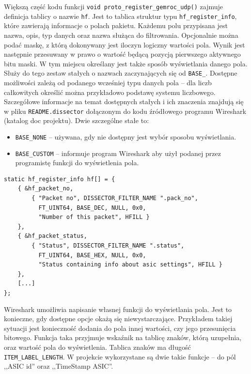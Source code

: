 \documentclass[a4paper, 12pt, twoside, openright]{article}
\begin{document}
\indent\par
Większą część kodu funkcji \texttt{void proto\_register\_gemroc\_udp()} zajmuje definicja tablicy o nazwie \texttt{hf}.
Jest to tablica struktur typu \texttt{hf\_register\_info}, które zawierają informacje o polach pakietu. Każdemu polu przypisana
jest nazwa, opis, typ danych oraz nazwa służąca do filtrowania. Opcjonalnie można podać maskę, z którą dokonywany jest iloczyn logiczny
wartości pola. Wynik jest następnie przesuwany w prawo o wartość będącą pozycją pierwszego aktywnego bitu maski.
W tym miejscu określany jest także sposób wyświetlania danego pola. Służy do tego zestaw stałych o nazwach
zaczynających się od \texttt{BASE\_}. Dostępne możliwości zależą od podanego wcześniej typu danych pola -- dla liczb całkowitych
określić można przykładowo podstawę systemu liczbowego. Szczegółowe informacje na temat dostępnych stałych i ich znaczenia
znajdują się w pliku \texttt{README.dissector} dołączonym do kodu źródłowego programu Wireshark (katalog doc projektu).
Dwie szczególne stałe to:
\begin{itemize}
	\item \texttt{BASE\_NONE} -- używana, gdy nie dostępny jest wybór sposobu wyświetlania.
	\item \texttt{BASE\_CUSTOM} -- informuje program Wireshark aby użył podanej przez programistę funkcji do wyświetlenia pola.
\end{itemize}

\begin{lstlisting}[style=CStyle]
static hf_register_info hf[] = {
	{ &hf_packet_no,
		{ "Packet no", DISSECTOR_FILTER_NAME ".pack_no",
		  FT_UINT64, BASE_DEC, NULL, 0x0,
		  "Number of this packet", HFILL }
	},
	{ &hf_packet_status,
		{ "Status", DISSECTOR_FILTER_NAME ".status",
		  FT_UINT64, BASE_HEX, NULL, 0x0,
		  "Status containing info about asic settings", HFILL }
	},
	[...]
};

\end{lstlisting}

Wireshark umożliwia napisanie własnej funkcji do wyświetlania pola. Jest to konieczne, gdy dostępne opcje okażą się niewystarczające.
Przykładem takiej sytuacji jest konieczność dodania do pola innej wartości, czy jego przesunięcia bitowego.
Funkcja taka przyjmuje wskaźnik na tablicę znaków, którą uzupełnia, oraz wartość pola do wyświetlenia. Tablica znaków ma długość
\texttt{ITEM\_LABEL\_LENGTH}. W projekcie wykorzystane są dwie takie funkcje -- do pól ,,ASIC id'' oraz ,,TimeStamp ASIC''.
\end{document}
